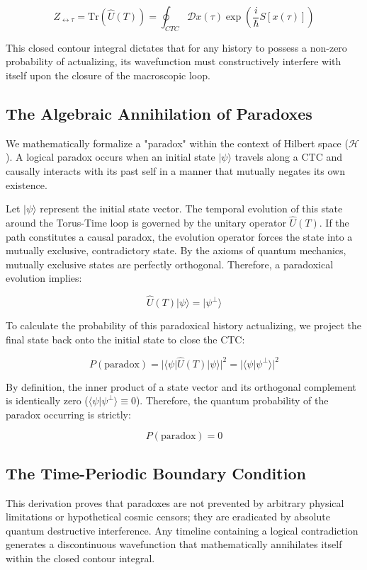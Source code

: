 \documentclass[12pt,openany]{book}
\begin{document}
\begin{equation}
Z_{\leftrightarrow\tau} = \text{Tr}(\hat{U}(T)) = \oint_{CTC} \mathcal{D}x(\tau) \exp\left(\frac{i}{\hbar}S[x(\tau)]\right)
\end{equation}

This closed contour integral dictates that for any history to possess a non-zero probability of actualizing, its wavefunction must constructively interfere with itself upon the closure of the macroscopic loop.

\subsection{The Algebraic Annihilation of Paradoxes}
We mathematically formalize a "paradox" within the context of Hilbert space ($\mathcal{H}$). A logical paradox occurs when an initial state $|\psi\rangle$ travels along a CTC and causally interacts with its past self in a manner that mutually negates its own existence. 

Let $|\psi\rangle$ represent the initial state vector. The temporal evolution of this state around the Torus-Time loop is governed by the unitary operator $\hat{U}(T)$. If the path constitutes a causal paradox, the evolution operator forces the state into a mutually exclusive, contradictory state. By the axioms of quantum mechanics, mutually exclusive states are perfectly orthogonal. Therefore, a paradoxical evolution implies:

\begin{equation}
\hat{U}(T)|\psi\rangle = |\psi^\perp\rangle
\end{equation}

To calculate the probability of this paradoxical history actualizing, we project the final state back onto the initial state to close the CTC:

\begin{equation}
P(\text{paradox}) = |\langle\psi|\hat{U}(T)|\psi\rangle|^2 = |\langle\psi|\psi^\perp\rangle|^2
\end{equation}

By definition, the inner product of a state vector and its orthogonal complement is identically zero ($\langle\psi|\psi^\perp\rangle \equiv 0$). Therefore, the quantum probability of the paradox occurring is strictly:

\begin{equation}
P(\text{paradox}) = 0
\end{equation}

\subsection{The Time-Periodic Boundary Condition}
This derivation proves that paradoxes are not prevented by arbitrary physical limitations or hypothetical cosmic censors; they are eradicated by absolute quantum destructive interference. Any timeline containing a logical contradiction generates a discontinuous wavefunction that mathematically annihilates itself within the closed contour integral. 
\end{document}
